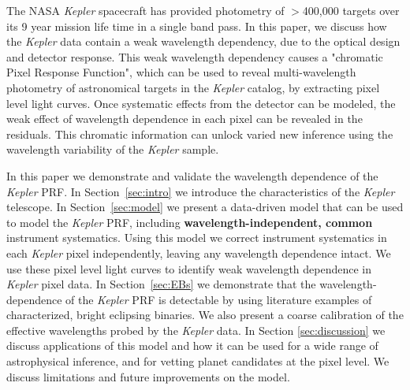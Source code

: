 \documentclass[iop]{emulateapj}
\newcommand{\kepler}{\emph{Kepler}\xspace}
\newcommand{\tess}{\emph{TESS}\xspace}
\begin{document}


The NASA \kepler spacecraft has provided photometry of $>$400,000 targets over its 9 year mission life time in a single band pass. In this paper, we discuss how the \kepler data contain a weak wavelength dependency, due to the optical design and detector response. This weak wavelength dependency causes a "chromatic Pixel Response Function", which can be used to reveal multi-wavelength photometry of astronomical targets in the \kepler catalog, by extracting pixel level light curves. Once systematic effects from the detector can be modeled, the weak effect of wavelength dependence in each pixel can be revealed in the residuals. This chromatic information can unlock varied new inference using the wavelength variability of the \kepler sample.


In this paper we demonstrate and validate the wavelength dependence of the \kepler PRF. In Section~\ref{sec:intro} we introduce the characteristics of the \kepler telescope. In Section~\ref{sec:model} we present a data-driven model that can be used to model the \kepler PRF, including \textbf{wavelength-independent, common} instrument systematics.  Using this model we correct instrument systematics in each \kepler pixel independently, leaving any wavelength dependence intact. We use these pixel level light curves to identify weak wavelength dependence in \kepler pixel data. In Section~\ref{sec:EBs} we demonstrate that the wavelength-dependence of the \kepler PRF is detectable by using literature examples of characterized, bright eclipsing binaries. We also present a coarse calibration of the effective wavelengths probed by the \kepler data. In Section \ref{sec:discussion} we discuss applications of this model and how it can be used for a wide range of astrophysical inference, and for vetting planet candidates at the pixel level. We discuss limitations and future improvements on the model. %
\end{document}
